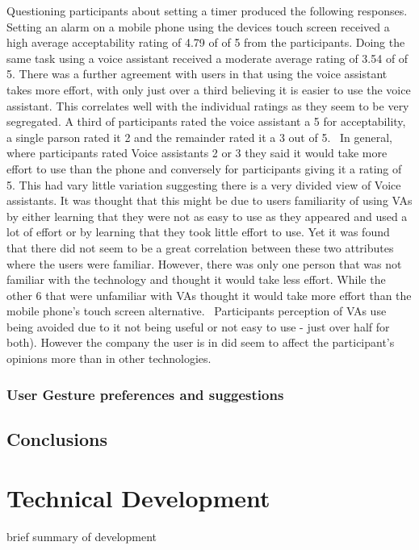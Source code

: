 \documentclass{l4proj}
\begin{document}
Questioning participants about setting a timer produced the following responses. Setting an alarm on a mobile phone using the devices touch screen received a high average acceptability rating of 4.79 of of 5 from the participants. Doing the same task using a voice assistant received a moderate average rating of 3.54 of of 5. There was a further agreement with users in that using the voice assistant takes more effort, with only just over a third believing it is easier to use the voice assistant. This correlates well with the individual ratings as they seem to be very segregated. A third of participants rated the voice assistant a 5 for acceptability, a single parson rated it 2 and the remainder rated it a 3 out of 5.  In general, where participants rated Voice assistants 2 or 3 they said it would take more effort to use than the phone and conversely for participants giving it a rating of 5. This had vary little variation suggesting there is a very divided view of Voice assistants. It was thought that this might be due to users familiarity of using VAs by either learning that they were not as easy to use as they appeared and used a lot of effort or by learning that they took little effort to use. Yet it was found that there did not seem to be a great correlation between these two attributes where the users were familiar. However, there was only one person that was not familiar with the technology and thought it would take less effort. While the other 6 that were unfamiliar with VAs thought it would take more effort than the mobile phone's touch screen alternative.  Participants perception of VAs use being avoided due to it not being useful or not easy to use - just over half for both). However the company the user is in did seem to affect the participant's opinions more than in other technologies.  

\subsection{User Gesture preferences and suggestions}


\section{Conclusions}


\chapter{Technical Development}
brief summary of development
\end{document}
